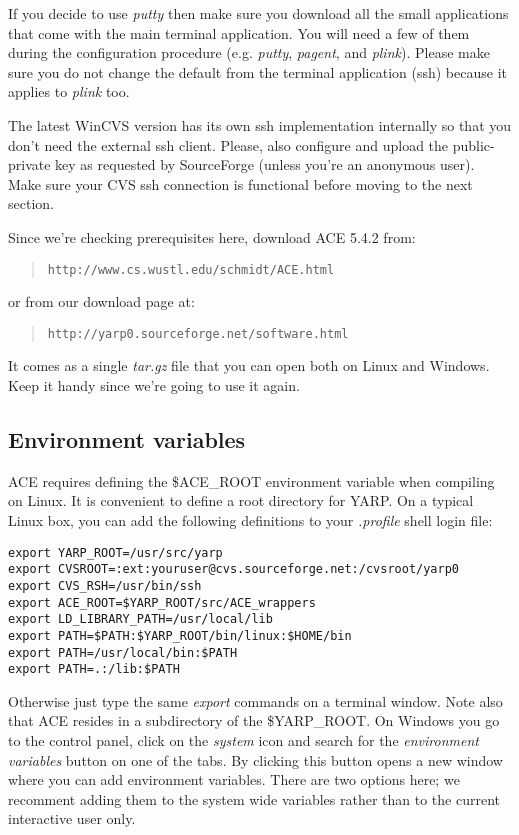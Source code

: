 If you decide to use {\em putty} then make sure you download all the small applications that come with the main terminal application. You will need a few of them during the configuration procedure (e.g. {\em putty}, {\em pagent}, and {\em plink}). Please make sure you do not change the default from the terminal application (ssh) because it applies to {\em plink} too.

The latest WinCVS version has its own ssh implementation internally so that you don't need the external ssh client. Please, also configure and upload the public-private key as requested by SourceForge (unless you're an anonymous user). Make sure your CVS ssh connection is functional before moving to the next section. 

Since we're checking prerequisites here, download ACE 5.4.2 from:

\begin{quote}
{\tt http://www.cs.wustl.edu/schmidt/ACE.html}
\end{quote}

or from our download page at:
\begin{quote}
{\tt http://yarp0.sourceforge.net/software.html}
\end{quote}

It comes as a single {\em tar.gz} file that you can open both on Linux and Windows. Keep it handy since we're going to use it again.

\subsection{Environment variables}
ACE requires defining the \$ACE\_ROOT environment variable when compiling on Linux. It is convenient to define a root directory for YARP. On a typical Linux box, you can add the following definitions to your {\em .profile} shell login file:

\begin{verbatim}
export YARP_ROOT=/usr/src/yarp
export CVSROOT=:ext:youruser@cvs.sourceforge.net:/cvsroot/yarp0
export CVS_RSH=/usr/bin/ssh
export ACE_ROOT=$YARP_ROOT/src/ACE_wrappers
export LD_LIBRARY_PATH=/usr/local/lib
export PATH=$PATH:$YARP_ROOT/bin/linux:$HOME/bin
export PATH=/usr/local/bin:$PATH
export PATH=.:/lib:$PATH
\end{verbatim}

Otherwise just type the same {\em export} commands on a terminal window. Note also that ACE resides in a subdirectory of the \$YARP\_ROOT. On Windows you go to the control panel, click on the {\em system} icon and search for the {\em environment variables} button on one of the tabs. By clicking this button opens a new window where you can add environment variables. There are two options here; we recomment adding them to the system wide variables rather than to the current interactive user only. 

